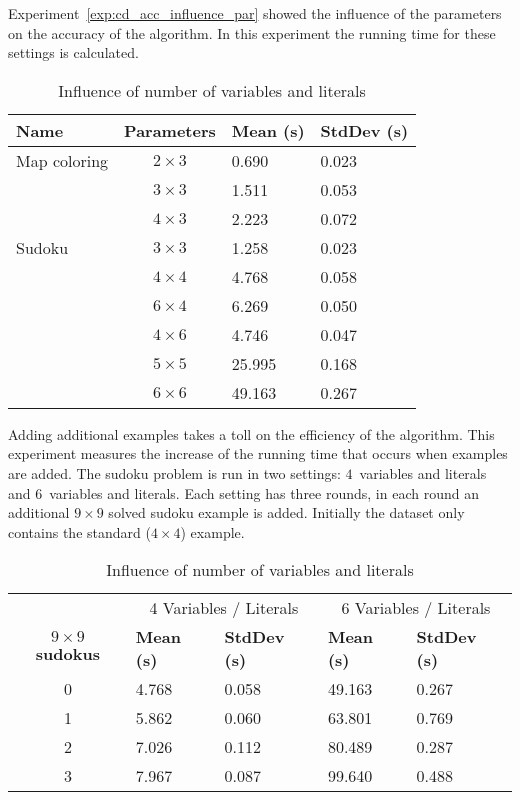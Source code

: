 \begin{experiment}
	Experiment~\ref{exp:cd_acc_influence_par} showed the influence of the parameters on the accuracy of the algorithm.
	In this experiment the running time for these settings is calculated.

	\begin{table}[!htp]
		\begin{tabularx}{\textwidth}{lc|XX}
			\textbf{Name}	& \textbf{Parameters}	& \textbf{Mean (s)}	& \textbf{StdDev (s)} \\
			\toprule
			Map coloring 	& $2 \times 3$ 			& 0.690				& 0.023	\\
							& $3 \times 3$ 			& 1.511				& 0.053	\\
							& $4 \times 3$ 			& 2.223				& 0.072	\\
			\midrule	
			Sudoku 			& $3 \times 3$ 			& 1.258				& 0.023	\\
							& $4 \times 4$ 			& 4.768				& 0.058	\\
							& $6 \times 4$ 			& 6.269				& 0.050	\\
							& $4 \times 6$ 			& 4.746				& 0.047	\\
							& $5 \times 5$ 			& 25.995			& 0.168	\\
							& $6 \times 6$ 			& 49.163			& 0.267
		\end{tabularx}
		\label{tbl:cd_speed_influence}
		\caption{Influence of number of variables and literals}
	\end{table}

\end{experiment}

\begin{experiment}
	Adding additional examples takes a toll on the efficiency of the algorithm.
	This experiment measures the increase of the running time that occurs when examples are added.
	The sudoku problem is run in two settings: $4$~variables and literals and $6$~variables and literals.
	Each setting has three rounds, in each round an additional $9 \times 9$ solved sudoku example is added.
	Initially the dataset only contains the standard ($4 \times 4$) example.

	\begin{table}[!htp]
		\begin{tabularx}{\textwidth}{c|XX|XX}
											& \multicolumn{2}{c}{4 Variables / Literals} & \multicolumn{2}{c}{6 Variables / Literals} \\
			\textbf{$9 \times 9$ sudokus}	& \textbf{Mean (s)} & \textbf{StdDev (s)} & \textbf{Mean (s)} & \textbf{StdDev (s)} \\
			\toprule
			0 & 4.768 & 0.058	& 49.163	& 0.267	\\
			1 & 5.862 & 0.060	& 63.801	& 0.769	\\
			2 & 7.026 & 0.112	& 80.489	& 0.287	\\
			3 & 7.967 & 0.087	& 99.640	& 0.488	\\
		\end{tabularx}
		\label{tbl:cd_speed_examples}
		\caption{Influence of number of variables and literals}
	\end{table}
\end{experiment}

